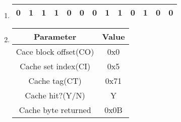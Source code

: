 \documentclass{article}
\begin{document}
\begin{enumerate}[label=\textbf{\Alph*.}]
	\item 
\begin{tabular}{|c|c|c|c|c|c|c|c|c|c|c|c|c|}
	\hline
	0&1&1&1&0&0&0&1&1&0&1&0&0 \\
	\hline
\end{tabular}
	\item
	\begin{tabular}{c c}
		Parameter & Value \\
		\hline
		Cace block offset(CO) & 0x0 \\
		Cache set index(CI) & 0x5 \\
		Cache tag(CT) & 0x71 \\
		Cache hit?(Y/N) & Y \\
		Cache byte returned & 0x0B \\
	\end{tabular}
\end{enumerate}
\end{document}
